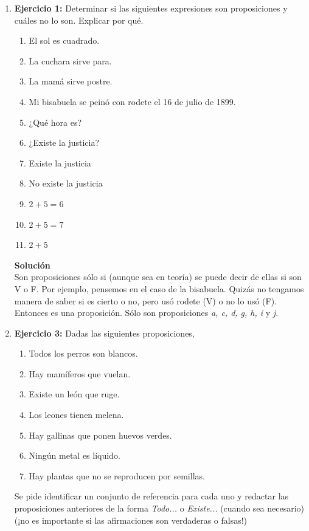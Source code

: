 \documentclass[12pt]{article}
\theoremstyle{definition}
\theoremstyle{remark}
\begin{document}
\begin{enumerate}


\item \textbf{Ejercicio 1:} Determinar si las siguientes expresiones son proposiciones y cuáles no lo son. Explicar por qué.
\begin{multicols}{2}
 \begin{enumerate}
 \setlength\itemsep{0em}
        \item El sol es cuadrado.
        \item La cuchara sirve para.
        \item La mamá sirve postre.
        \item Mi bisabuela se peinó con rodete el 16 de julio de 1899.
        \item ¿Qué hora es?
        \item ¿Existe la justicia?
        \item Existe la justicia
        \item No existe la justicia
        \item $2 + 5 = 6$
        \item $2 + 5 = 7$
        \item$2 + 5 $
  \end{enumerate}
\end{multicols}
\noindent
\textbf{Solución} \\
Son proposiciones sólo si (aunque sea en teoría) se puede decir de ellas si son V o F. Por ejemplo, pensemos en el caso de la bisabuela. Quizás no tengamos manera de saber si es cierto o no, pero usó rodete (V) o no lo usó (F). Entonces es una proposición. Sólo son  proposiciones \textit{a, c, d, g, h, i} y  \textit{j}.


\item \textbf{Ejercicio 3:} Dadas las siguientes proposiciones,
 \begin{multicols}{2}
 \begin{enumerate}
 \setlength\itemsep{0em}
     	\item Todos los perros son blancos.
	\item Hay mamíferos que vuelan.
	\item Existe un león que ruge.
	\item Los leones tienen melena.
	\item Hay gallinas que ponen huevos verdes.
	\item Ningún metal es líquido.
	\item Hay plantas que no se reproducen por semillas.
  \end{enumerate}
\end{multicols}
 Se pide identificar un conjunto de referencia para cada uno  y redactar las proposiciones anteriores de la forma  \textit{Todo...} o \textit{Existe...} (cuando sea necesario)(¡no es importante si las afirmaciones son verdaderas o falsas!)


\end{enumerate}
\end{document}
